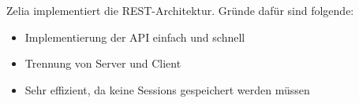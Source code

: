 
Zelia implementiert die REST-Architektur. Gründe dafür sind folgende: 

\begin{itemize}
    \item Implementierung der API einfach und schnell
    \item Trennung von Server und Client 
    \item Sehr effizient, da keine Sessions gespeichert werden müssen 
\end{itemize} \cite{WikiREST}